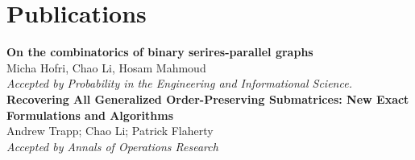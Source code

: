 \documentclass[]{friggeri-cv}
\begin{document}
\section{Publications}
\textbf{On the combinatorics of binary serires-parallel graphs}\\
Micha Hofri, Chao Li, Hosam Mahmoud\\
\emph{Accepted by Probability in the Engineering and Informational Science.}\\
\textbf{Recovering All Generalized Order-Preserving Submatrices: New Exact
Formulations and Algorithms}\\
Andrew Trapp; Chao Li; Patrick Flaherty\\
\emph{Accepted by Annals of Operations Research}
\end{document}
